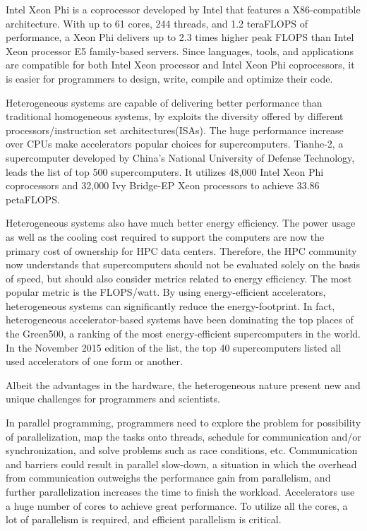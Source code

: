 Intel Xeon Phi is a coprocessor developed by Intel that features a 
X86-compatible architecture. With up to 61 cores, 244 threads, 
and 1.2 teraFLOPS of performance, a Xeon Phi delivers up to 2.3 times higher 
peak FLOPS than Intel Xeon processor E5 family-based servers.
Since languages, tools, and applications are compatible for both Intel Xeon 
processor and Intel Xeon Phi coprocessors, it is easier for programmers to
design, write, compile and optimize their code. 




Heterogeneous systems are capable of delivering better performance than 
traditional homogeneous systems, by exploits the diversity offered by different 
processors/instruction set architectures(ISAs). 
The huge performance increase over CPUs make accelerators popular choices for
supercomputers. Tianhe-2, a supercomputer developed by China’s National 
University of Defense Technology, leads the list of top 500 supercomputers.
It utilizes 48,000  Intel Xeon Phi coprocessors and 32,000 Ivy Bridge-EP Xeon 
processors to achieve 33.86 petaFLOPS.

Heterogeneous systems also have much better energy efficiency. 
The power usage as well as the cooling cost required to support the computers
are now the primary cost of ownership for HPC data centers. Therefore,
the HPC community now understands that supercomputers should not be evaluated
solely on the basis of speed, but should also consider metrics related to 
energy efficiency. The most popular metric is the FLOPS/watt.
By using energy-efficient accelerators,
heterogeneous systems can significantly reduce the energy-footprint. 
In fact, heterogeneous accelerator-based systems have been dominating the 
top places of the Green500, %
a ranking of the most energy-efficient supercomputers in the world. 
In the November 2015 edition of the list, 
the top 40 supercomputers listed all used accelerators of one form or another.

Albeit the advantages in the hardware, the heterogeneous nature present new
and unique challenges for programmers and scientists. 

In parallel programming, programmers need to explore the problem for 
possibility of parallelization, map the tasks onto threads, schedule for
communication and/or synchronization, and solve problems such as race conditions,
etc. Communication and barriers could result in parallel slow-down, 
a situation in which the overhead from communication outweighs the performance 
gain from parallelism, and further parallelization increases the time to finish
the workload. 
Accelerators use a huge number of cores to achieve great performance. 
To utilize all the cores, a lot of parallelism is required, and efficient 
parallelism is critical.

